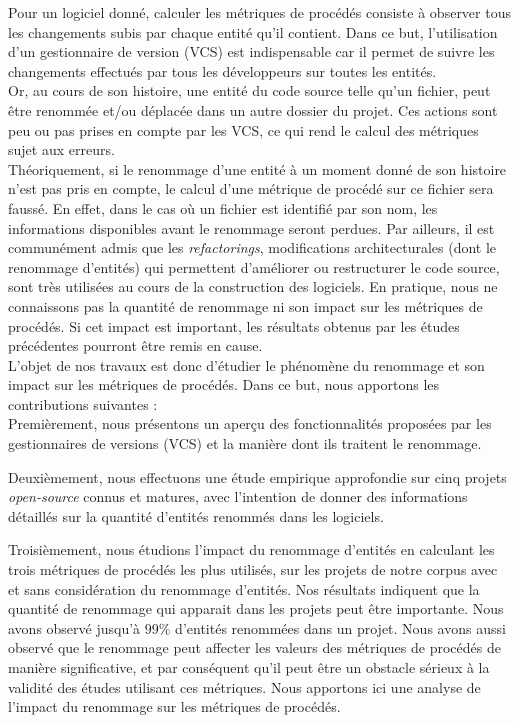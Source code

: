 Pour un logiciel donné, calculer les métriques de procédés consiste à observer tous les changements subis par chaque entité qu'il contient. Dans ce but, l'utilisation d'un gestionnaire de version (VCS) est indispensable car il permet de suivre les changements effectués par tous les développeurs sur toutes les entités.\\ 

Or, au cours de son histoire, une entité du code source telle qu'un fichier, peut être renommée et/ou déplacée dans un autre dossier du projet. Ces actions sont peu ou pas prises en compte par les VCS, ce qui rend le calcul des métriques sujet aux erreurs.\\

Théoriquement, si le renommage d'une entité à un moment donné de son histoire n'est pas pris en compte, le calcul d'une métrique de procédé sur ce fichier sera faussé. En effet, dans le cas où un fichier est identifié par son nom, les informations disponibles avant le renommage seront perdues. Par ailleurs, il est communément admis que les \textit{refactorings}, modifications architecturales (dont le renommage d'entités) qui permettent d'améliorer ou restructurer le code source, sont très utilisées au cours de la construction des logiciels. En pratique, nous ne connaissons pas la quantité de renommage ni son impact sur les métriques de procédés. Si cet impact est important, les résultats obtenus par les études précédentes pourront être remis en cause.\\

L'objet de nos travaux est donc d’étudier le phénomène du renommage et son impact sur les métriques de procédés. Dans ce but, nous apportons les contributions suivantes :\\

Premièrement, nous présentons un aperçu des fonctionnalités proposées par les gestionnaires de versions (VCS) et la manière dont ils traitent le renommage.

Deuxièmement, nous effectuons une étude empirique approfondie sur cinq projets \textit{open-source} connus et matures, avec l'intention de donner des informations détaillés sur la quantité d'entités renommés dans les logiciels.

Troisièmement, nous étudions l'impact du renommage d'entités en calculant les trois métriques de procédés les plus utilisés, sur les projets de notre corpus avec et sans considération du renommage d'entités. Nos résultats indiquent que la quantité de renommage qui apparait dans les projets peut être importante. Nous avons observé jusqu'à $99\%$ d'entités renommées dans un projet. Nous avons aussi observé que le renommage peut affecter les valeurs des métriques de procédés de manière significative, et par conséquent qu'il peut être un obstacle sérieux à la validité des études utilisant ces métriques. Nous apportons ici une analyse de l'impact du renommage sur les métriques de procédés.

